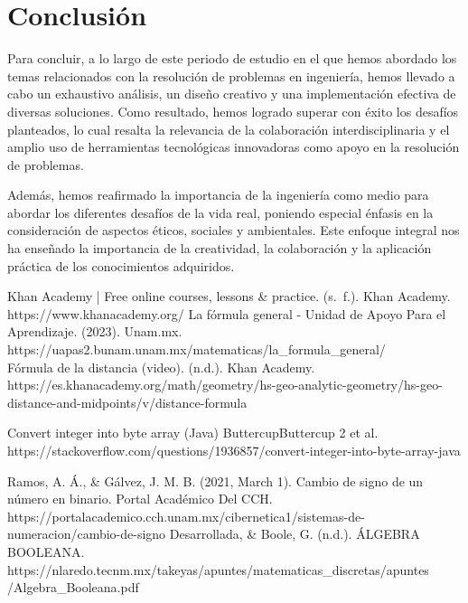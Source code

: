 \documentclass[conference]{IEEEtran}
\begin{document}












\clearpage
\section{Conclusión}
 Para concluir, a lo largo de este periodo de estudio en el que hemos abordado los temas relacionados con la resolución de problemas en ingeniería, hemos llevado a cabo un exhaustivo análisis, un diseño creativo y una implementación efectiva de diversas soluciones. Como resultado, hemos logrado superar con éxito los desafíos planteados, lo cual resalta la relevancia de la colaboración interdisciplinaria y el amplio uso de herramientas tecnológicas innovadoras como apoyo en la resolución de problemas.

Además, hemos reafirmado la importancia de la ingeniería como medio para abordar los diferentes desafíos de la vida real, poniendo especial énfasis en la consideración de aspectos éticos, sociales y ambientales. Este enfoque integral nos ha enseñado la importancia de la creatividad, la colaboración y la aplicación práctica de los conocimientos adquiridos.

\begin{thebibliography}{00}

      Khan Academy | Free online courses, lessons & practice. (s. f.). Khan Academy. https://www.khanacademy.org/
     La fórmula general - Unidad de Apoyo Para el Aprendizaje. (2023). Unam.mx. https://uapas2.bunam.unam.mx/matematicas/la\_formula\_general/\\
    
    Fórmula de la distancia (video). (n.d.). Khan Academy. https://es.khanacademy.org/math/geometry/hs-geo-analytic-geometry/hs-geo-distance-and-midpoints/v/distance-formula 
    
    Convert integer into byte array (Java) ButtercupButtercup 2 et al.
    https://stackoverflow.com/questions/1936857/convert-integer-into-byte-array-java
    
    Ramos, A. Á., \& Gálvez, J. M. B. (2021, March 1). Cambio de signo de un número en binario. Portal Académico Del CCH. https://portalacademico.cch.unam.mx/cibernetica1/sistemas-de-numeracion/cambio-de-signo
    Desarrollada, \& Boole, G. (n.d.). ÁLGEBRA BOOLEANA. https://nlaredo.tecnm.mx/takeyas/apuntes/matematicas\_discretas/apuntes
    /Algebra\_Booleana.pdf

‌
     \\
     
\end{thebibliography}
\end{document}
